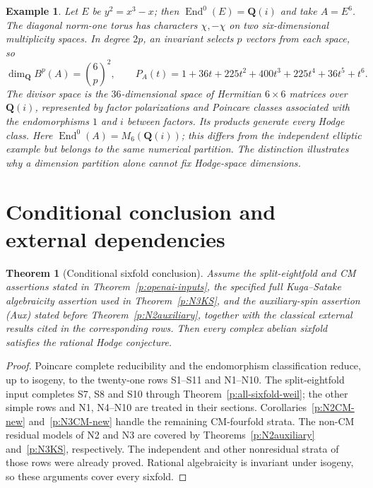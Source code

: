 \documentclass[10pt,reqno]{article}
\theoremstyle{emphasizedplain}
\theoremstyle{emphasizeddefinition}
\newtheorem{example}[theorem]{Example}
\theoremstyle{emphasizeddefinition}
\newtheorem{pretheorem}[prelemma]{Theorem}
\DeclareMathOperator{\End}{End}
\newcommand{\Q}{\mathbf Q}
\newcommand{\B}{B}
\begin{document}
\begin{example}
Let $E$ be $y^2=x^3-x$; then $\End^0(E)=\Q(i)$ and take $A=E^6$.
The diagonal norm-one torus has characters $\chi,-\chi$ on two
six-dimensional multiplicity spaces. In degree $2p$, an invariant selects
$p$ vectors from each space, so
\[
 \dim_\Q\B^p(A)=\binom6p^2,\qquad
 P_A(t)=1+36t+225t^2+400t^3+225t^4+36t^5+t^6.
\]
The divisor space is the $36$-dimensional space of Hermitian $6\times6$
matrices over $\Q(i)$, represented by factor polarizations and Poincare
classes associated with the endomorphisms $1$ and $i$ between factors.
Its products generate every Hodge class. Here
$\End^0(A)=M_6(\Q(i))$; this differs from the independent elliptic example
but belongs to the same numerical partition. The distinction illustrates
why a dimension partition alone cannot fix Hodge-space dimensions.
\end{example}

\section*{Conditional conclusion and external dependencies}
\begin{pretheorem}[Conditional sixfold conclusion]
\label{p:conditional-sixfold}
Assume the split-eightfold and CM assertions stated in
Theorem~\ref{p:openai-inputs}, the specified full Kuga--Satake
algebraicity assertion used in Theorem~\ref{p:N3KS}, and the
auxiliary-spin assertion (Aux) stated before
Theorem~\ref{p:N2auxiliary}, together with the classical external
results cited in the corresponding rows. Then every complex
abelian sixfold satisfies the rational Hodge conjecture.
\end{pretheorem}
\begin{proof}
Poincare complete reducibility and the endomorphism classification
reduce, up to isogeny, to the twenty-one rows S1--S11 and N1--N10.
The split-eightfold input completes S7, S8 and S10 through
Theorem~\ref{p:all-sixfold-weil}; the other simple rows and N1,
N4--N10 are treated in their sections.
Corollaries~\ref{p:N2CM-new} and~\ref{p:N3CM-new} handle the
remaining CM-fourfold strata. The non-CM residual models of
N2 and N3 are covered by Theorems~\ref{p:N2auxiliary}
and~\ref{p:N3KS}, respectively. The independent and other
nonresidual strata of those rows were already proved.
Rational algebraicity is invariant under isogeny, so these
arguments cover every sixfold.
\end{proof}
\end{document}
